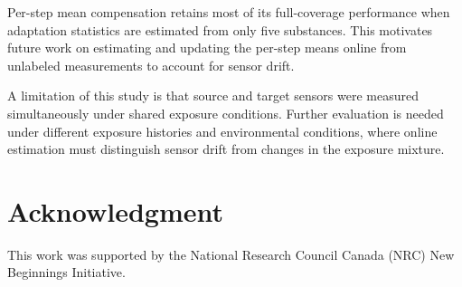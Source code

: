 \documentclass[conference]{IEEEtran}
\begin{document}
Per-step mean compensation retains most of its full-coverage performance when adaptation statistics are estimated from only five substances. This motivates future work on estimating and updating the per-step means online from unlabeled measurements to account for sensor drift.

A limitation of this study is that source and target sensors were measured simultaneously under shared exposure conditions. Further evaluation is needed under different exposure histories and environmental conditions, where online estimation must distinguish sensor drift from changes in the exposure mixture.

\section*{Acknowledgment}
This work was supported by the National Research Council Canada (NRC) New Beginnings Initiative.

\printbibliography
\end{document}
